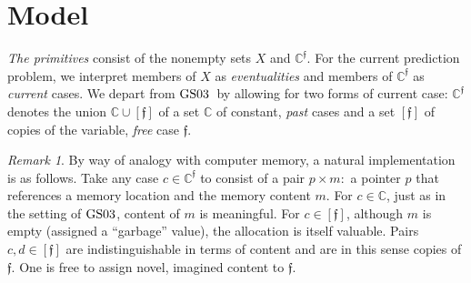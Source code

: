 \documentclass[ecta,nameyear,draft]{econsocart}
\newcommand{\novel}{\mathfrak f}
\newcommand{\mbbc}{{\mathds C}}
\newcommand{\mbbcp}{{\mathds C^{\novel}}}
\newcommand{\gsii}{$\textup{GS03}$}
\theoremstyle{plain}
\theoremstyle{remark}
\newtheorem*{remark*}{Remark}
\begin{document}
\section{Model}\label{sec-model}
\emph{The primitives} consist of the nonempty sets $X$ and
$\mbbcp$.  For the current prediction problem, we interpret members of $X$ as
\emph{eventualities} and members of $\mbbcp$ as \emph{current} cases. We depart
from \gsii\ by allowing for two forms of current case: $\mbbcp$ denotes the
union $\mbbc \cup [\novel]$ of a set $\mbbc$ of constant, \emph{past} cases and
a set $[\novel]$ of copies of the variable, \emph{free} case $\novel$.
\begin{remark*}
  By way of analogy with computer memory, a natural implementation is as
  follows.  Take any case $c \in \mbbcp$ to consist of a pair $p \times m:$ a
  pointer $p$ that references a memory location and the memory content $m$. For
  $c\in \mbbc$, just as in the setting of \gsii, content of $m$ is meaningful. 
  For $c \in [\novel]$, although $m$ is empty (assigned a ``garbage'' value),
  the allocation is itself valuable. Pairs $c, d\in [\novel]$ are
  indistinguishable in terms of content and are in this sense copies of
  $\novel$. One is free to assign novel, imagined content to $\novel$.
\end{remark*}
\end{document}
